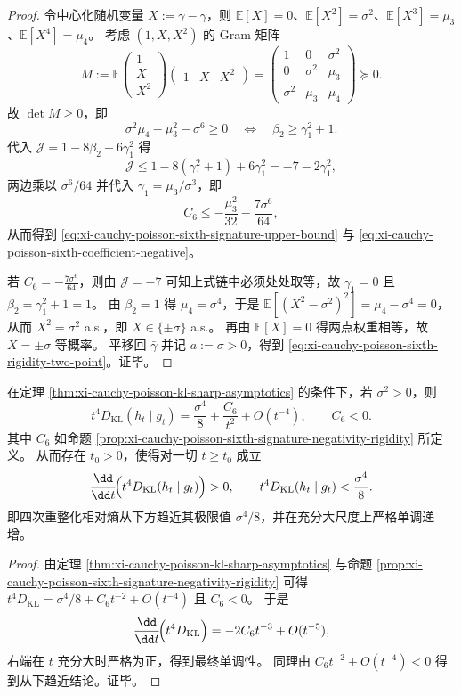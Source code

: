 \begin{proof}
令中心化随机变量 \(X:=\gamma-\bar\gamma\)，则 \(\mathbb E[X]=0\)、\(\mathbb E[X^2]=\sigma^2\)、\(\mathbb E[X^3]=\mu_3\)、\(\mathbb E[X^4]=\mu_4\)。
考虑 \((1,X,X^2)\) 的 Gram 矩阵
\[
M:=\mathbb E
\begin{pmatrix}
1\\ X\\ X^2
\end{pmatrix}
\begin{pmatrix}
1&X&X^2
\end{pmatrix}
=
\begin{pmatrix}
1&0&\sigma^2\\
0&\sigma^2&\mu_3\\
\sigma^2&\mu_3&\mu_4
\end{pmatrix}\succeq 0.
\]
故 \(\det M\ge 0\)，即
\[
\sigma^2\mu_4-\mu_3^2-\sigma^6\ge 0
\quad\Longleftrightarrow\quad
\beta_2\ge \gamma_1^2+1.
\]
代入 \(\mathcal J=1-8\beta_2+6\gamma_1^2\) 得
\[
\mathcal J\le 1-8(\gamma_1^2+1)+6\gamma_1^2=-7-2\gamma_1^2,
\]
两边乘以 \(\sigma^6/64\) 并代入 \(\gamma_1=\mu_3/\sigma^3\)，即
\[
C_6\le -\frac{\mu_3^2}{32}-\frac{7\sigma^6}{64},
\]
从而得到 \eqref{eq:xi-cauchy-poisson-sixth-signature-upper-bound} 与 \eqref{eq:xi-cauchy-poisson-sixth-coefficient-negative}。
\par
若 \(C_6=-\frac{7\sigma^6}{64}\)，则由 \(\mathcal J=-7\) 可知上式链中必须处处取等，故 \(\gamma_1=0\) 且 \(\beta_2=\gamma_1^2+1=1\)。
由 \(\beta_2=1\) 得 \(\mu_4=\sigma^4\)，于是 \(\mathbb E[(X^2-\sigma^2)^2]=\mu_4-\sigma^4=0\)，从而 \(X^2=\sigma^2\) a.s.，即 \(X\in\{\pm\sigma\}\) a.s.。
再由 \(\mathbb E[X]=0\) 得两点权重相等，故 \(X=\pm\sigma\) 等概率。
平移回 \(\bar\gamma\) 并记 \(a:=\sigma>0\)，得到 \eqref{eq:xi-cauchy-poisson-sixth-rigidity-two-point}。证毕。
\end{proof}

\begin{corollary}[四次重整化相对熵的最终单调趋近]\label{cor:xi-cauchy-poisson-kl-renormalized-monotone-approach}
在定理 \ref{thm:xi-cauchy-poisson-kl-sharp-asymptotics} 的条件下，若 \(\sigma^2>0\)，则
\[
t^4D_{\mathrm{KL}}(h_t\mid g_t)
=\frac{\sigma^4}{8}+\frac{C_6}{t^2}+O(t^{-4}),
\qquad
C_6<0.
\]
其中 \(C_6\) 如命题 \ref{prop:xi-cauchy-poisson-sixth-signature-negativity-rigidity} 所定义。
从而存在 \(t_0>0\)，使得对一切 \(t\ge t_0\) 成立
\[
\frac{\dd}{\dd t}\!\Bigl(t^4D_{\mathrm{KL}}(h_t\mid g_t)\Bigr)>0,
\qquad
t^4D_{\mathrm{KL}}(h_t\mid g_t)<\frac{\sigma^4}{8}.
\]
即四次重整化相对熵从下方趋近其极限值 \(\sigma^4/8\)，并在充分大尺度上严格单调递增。
\end{corollary}
\begin{proof}
由定理 \ref{thm:xi-cauchy-poisson-kl-sharp-asymptotics} 与命题 \ref{prop:xi-cauchy-poisson-sixth-signature-negativity-rigidity} 可得
\(
t^4D_{\mathrm{KL}}=\sigma^4/8+C_6t^{-2}+O(t^{-4})
\)
且 \(C_6<0\)。
于是
\[
\frac{\dd}{\dd t}\!\Bigl(t^4D_{\mathrm{KL}}\Bigr)
=-2C_6t^{-3}+O(t^{-5}),
\]
右端在 \(t\) 充分大时严格为正，得到最终单调性。
同理由 \(C_6t^{-2}+O(t^{-4})<0\) 得到从下趋近结论。证毕。
\end{proof}

